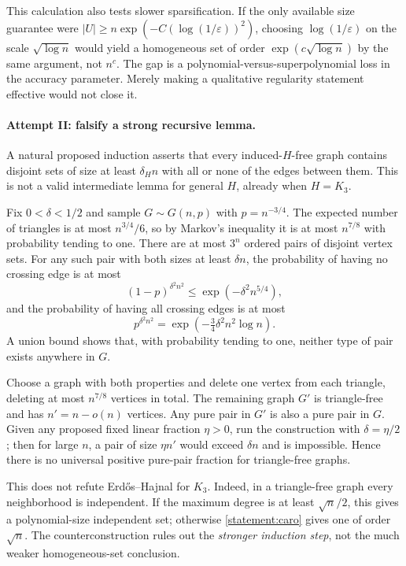 \documentclass[11pt,a4paper]{article}
\numberwithin{equation}{section}
\begin{document}
This calculation also tests slower sparsification.  If the only
available size guarantee were
$|U|\geq n\exp(-C(\log(1/\varepsilon))^2)$, choosing
$\log(1/\varepsilon)$ on the scale $\sqrt{\log n}$ would yield a
homogeneous set of order $\exp(c\sqrt{\log n})$ by the same argument,
not $n^c$.  The gap is a polynomial-versus-superpolynomial loss in the
accuracy parameter.  Merely making a qualitative regularity statement
effective would not close it.

\paragraph{Attempt II: falsify a strong recursive lemma.}
A natural proposed induction asserts that every induced-$H$-free graph
contains disjoint sets of size at least $\delta_H n$ with all or none
of the edges between them.  This is not a valid intermediate lemma
for general $H$, already when $H=K_3$.

Fix $0<\delta<1/2$ and sample $G\sim G(n,p)$ with $p=n^{-3/4}$.
The expected number of triangles is at most $n^{3/4}/6$, so by Markov's
inequality it is at most $n^{7/8}$ with probability tending to one.
There are at most $3^n$ ordered pairs of disjoint vertex sets.  For any
such pair with both sizes at least $\delta n$, the probability of
having no crossing edge is at most
\[
 (1-p)^{\delta^2n^2}\leq\exp(-\delta^2n^{5/4}),
\]
and the probability of having all crossing edges is at most
\[
 p^{\delta^2n^2}=\exp(-\tfrac34\delta^2n^2\log n).
\]
A union bound shows that, with probability tending to one, neither
type of pair exists anywhere in $G$.

Choose a graph with both properties and delete one vertex from each
triangle, deleting at most $n^{7/8}$ vertices in total.  The remaining
graph $G'$ is triangle-free and has $n'=n-o(n)$ vertices.  Any pure
pair in $G'$ is also a pure pair in $G$.  Given any proposed fixed
linear fraction $\eta>0$, run the construction with $\delta=\eta/2$;
then for large $n$, a pair of size $\eta n'$ would exceed $\delta n$
and is impossible.  Hence there is no universal positive pure-pair
fraction for triangle-free graphs.

This does not refute Erd\H{o}s--Hajnal for $K_3$.  Indeed, in a
triangle-free graph every neighborhood is independent.  If the maximum
degree is at least $\sqrt n/2$, this gives a polynomial-size independent
set; otherwise \eqref{statement:caro} gives one of order $\sqrt n$.
The counterconstruction rules out the \emph{stronger induction step},
not the much weaker homogeneous-set conclusion.
\end{document}
